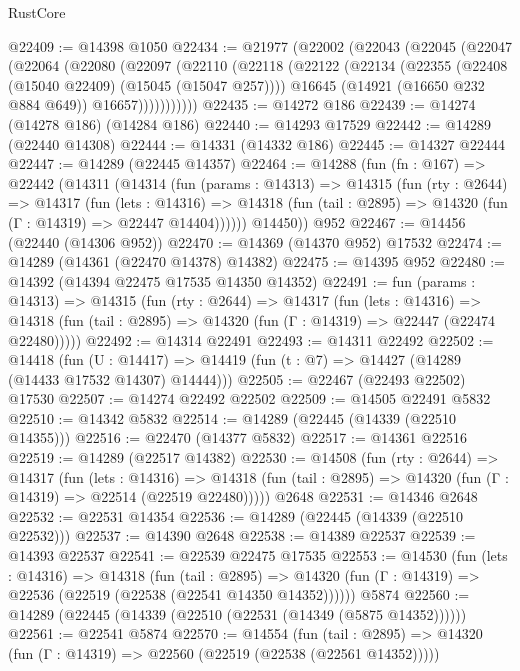 \begin{lexlean}{RustCore}
\begin{coremodule}
@22409 := @14398 @1050
@22434 := @21977
    (@22002
      (@22043
        (@22045
          (@22047
            (@22064
              (@22080
                (@22097
                  (@22110
                    (@22118
                      (@22122
                        (@22134
                          (@22355 (@22408 (@15040 @22409) (@15045 (@15047 @257))))
                          @16645
                          (@14921 (@16650 @232 @884 @649))
                          @16657)))))))))))
@22435 := @14272 @186
@22439 := @14274 (@14278 @186) (@14284 @186)
@22440 := @14293 @17529
@22442 := @14289 (@22440 @14308)
@22444 := @14331 (@14332 @186)
@22445 := @14327 @22444
@22447 := @14289 (@22445 @14357)
@22464 := @14288
    (fun (fn : @167) =>
    @22442
      (@14311
        (@14314
          (fun (params : @14313) =>
          @14315
            (fun (rty : @2644) =>
            @14317
              (fun (lets : @14316) =>
              @14318 (fun (tail : @2895) => @14320 (fun (Γ : @14319) => @22447 @14404))))))
        @14450))
    @952
@22467 := @14456 (@22440 (@14306 @952))
@22470 := @14369 (@14370 @952) @17532
@22474 := @14289 (@14361 (@22470 @14378) @14382)
@22475 := @14395 @952
@22480 := @14392 (@14394 @22475 @17535 @14350 @14352)
@22491 := fun (params : @14313) =>
  @14315
    (fun (rty : @2644) =>
    @14317
      (fun (lets : @14316) =>
      @14318 (fun (tail : @2895) => @14320 (fun (Γ : @14319) => @22447 (@22474 @22480)))))
@22492 := @14314 @22491
@22493 := @14311 @22492
@22502 := @14418
    (fun (U : @14417) => @14419 (fun (t : @7) => @14427 (@14289 (@14433 @17532 @14307) @14444)))
@22505 := @22467 (@22493 @22502) @17530
@22507 := @14274 @22492 @22502
@22509 := @14505 @22491 @5832
@22510 := @14342 @5832
@22514 := @14289 (@22445 (@14339 (@22510 @14355)))
@22516 := @22470 (@14377 @5832)
@22517 := @14361 @22516
@22519 := @14289 (@22517 @14382)
@22530 := @14508
    (fun (rty : @2644) =>
    @14317
      (fun (lets : @14316) =>
      @14318 (fun (tail : @2895) => @14320 (fun (Γ : @14319) => @22514 (@22519 @22480)))))
    @2648
@22531 := @14346 @2648
@22532 := @22531 @14354
@22536 := @14289 (@22445 (@14339 (@22510 @22532)))
@22537 := @14390 @2648
@22538 := @14389 @22537
@22539 := @14393 @22537
@22541 := @22539 @22475 @17535
@22553 := @14530
    (fun (lets : @14316) =>
    @14318
      (fun (tail : @2895) =>
      @14320 (fun (Γ : @14319) => @22536 (@22519 (@22538 (@22541 @14350 @14352))))))
    @5874
@22560 := @14289 (@22445 (@14339 (@22510 (@22531 (@14349 (@5875 @14352))))))
@22561 := @22541 @5874
@22570 := @14554
    (fun (tail : @2895) => @14320 (fun (Γ : @14319) => @22560 (@22519 (@22538 (@22561 @14352)))))

\end{coremodule}
\end{lexlean}
